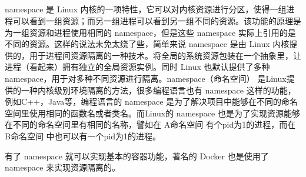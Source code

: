 \documentclass[../../../interview-questions.tex]{subfiles}
\begin{document}
\subsection{\color{red}{容器三把斧之Namespace原理与实现}}

namespace 是 Linux 内核的一项特性，它可以对内核资源进行分区，使得一组进程可以看到一组资源；而另一组进程可以看到另一组不同的资源。该功能的原理是为一组资源和进程使用相同的 namespace，但是这些 namespace 实际上引用的是不同的资源。这样的说法未免太绕了些，简单来说 namespace 是由 Linux 内核提供的，用于进程间资源隔离的一种技术。将全局的系统资源包装在一个抽象里，让进程（看起来）拥有独立的全局资源实例。同时 Linux 也默认提供了多种 namespace，用于对多种不同资源进行隔离。namespace（命名空间） 是Linux提供的一种内核级别环境隔离的方法，很多编程语言也有 namespace 这样的功能，例如C++，Java等，编程语言的 namespace 是为了解决项目中能够在不同的命名空间里使用相同的函数名或者类名。而Linux的 namespace 也是为了实现资源能够在不同的命名空间里有相同的名称，譬如在 A命名空间 有个pid为1的进程，而在 B命名空间 中也可以有一个pid为1的进程。

有了 namespace 就可以实现基本的容器功能，著名的 Docker 也是使用了 namespace 来实现资源隔离的。
\end{document}
